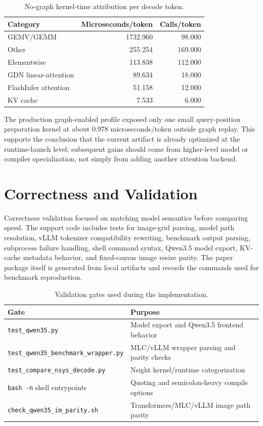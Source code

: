 \documentclass[10pt]{article}
\begin{document}
\begin{table}[t]
  \centering
  \caption{No-graph kernel-time attribution per decode token.}
  \label{tab:kernel-breakdown}
  \begin{tabular}{lrr}
    \toprule
    Category & Microseconds/token & Calls/token \\
    \midrule
    GEMV/GEMM & 1732.960 & 98.000 \\
    Other & 255.254 & 169.000 \\
    Elementwise & 113.838 & 112.000 \\
    GDN linear-attention & 89.634 & 18.000 \\
    FlashInfer attention & 51.158 & 12.000 \\
    KV cache & 7.533 & 6.000 \\
    \bottomrule
  \end{tabular}
\end{table}

The production graph-enabled profile exposed only one small query-position
preparation kernel at about 0.978 microseconds/token outside graph replay.
This supports the conclusion that the current artifact is already optimized at
the runtime-launch level; subsequent gains should come from higher-level model
or compiler specialization, not simply from adding another attention backend.

\section{Correctness and Validation}

Correctness validation focused on matching model semantics before comparing
speed. The support code includes tests for image-grid parsing, model path
resolution, vLLM tokenizer compatibility rewriting, benchmark output parsing,
subprocess failure handling, shell command syntax, Qwen3.5 model export,
KV-cache metadata behavior, and fixed-canvas image resize parity. The paper
package itself is generated from local artifacts and records the commands used
for benchmark reproduction.

\begin{table}[t]
  \centering
  \caption{Validation gates used during the implementation.}
  \label{tab:validation}
  \begin{tabular}{ll}
    \toprule
    Gate & Purpose \\
    \midrule
    \texttt{test\_qwen35.py} & Model export and Qwen3.5 frontend behavior \\
    \texttt{test\_qwen35\_benchmark\_wrapper.py} & MLC/vLLM wrapper parsing and parity checks \\
    \texttt{test\_compare\_nsys\_decode.py} & Nsight kernel/runtime categorization \\
    \texttt{bash -n} shell entrypoints & Quoting and semicolon-heavy compile options \\
    \texttt{check\_qwen35\_im\_parity.sh} & Transformers/MLC/vLLM image path parity \\
    \bottomrule
  \end{tabular}
\end{table}
\end{document}
